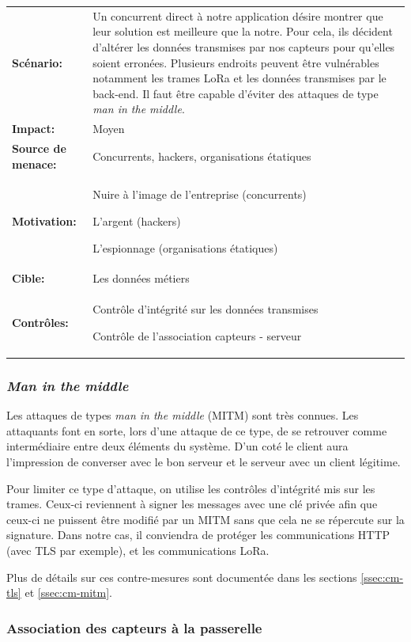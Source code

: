 \documentclass[12pt]{article}
\begin{document}
\renewcommand{\arraystretch}{1.6}
\begin{tabular}{@{}p{4cm}p{12cm}}
\textbf{Scénario:} &  Un concurrent direct à notre application désire montrer que leur solution est meilleure que la notre. Pour cela, ils décident d'altérer les données transmises par nos capteurs pour qu'elles soient erronées. Plusieurs endroits peuvent être vulnérables notamment les trames LoRa et les données transmises par le back-end. Il faut être capable d'éviter des attaques de type \emph{man in the middle}.  \\
\textbf{Impact:} & Moyen \\
\textbf{Source de menace: } & Concurrents, hackers, organisations étatiques \\
\textbf{Motivation:} & Nuire à l'image de l'entreprise (concurrents)

L'argent (hackers)

L'espionnage (organisations étatiques)\\
\textbf{Cible:} & Les données métiers\\
\textbf{Contrôles:} & Contrôle d'intégrité sur les données transmises

Contrôle de l'association capteurs - serveur
\end{tabular}
\renewcommand{\arraystretch}{1}

\subsubsection{\emph{Man in the middle}}

Les attaques de types \emph{man in the middle} (MITM) sont très connues. Les attaquants font en sorte, lors d'une attaque de ce type, de se retrouver comme intermédiaire entre deux éléments du système. D'un coté le client aura l'impression de converser avec le bon serveur et le serveur avec un client légitime. 

Pour limiter ce type d'attaque, on utilise les contrôles d'intégrité mis sur les trames. Ceux-ci reviennent à signer les messages avec une clé privée afin que ceux-ci ne puissent être modifié par un MITM sans que cela ne se répercute sur la signature. Dans notre cas, il conviendra de protéger les communications HTTP (avec TLS par exemple), et les communications LoRa. 

Plus de détails sur ces contre-mesures sont documentée dans les sections \ref{ssec:cm-tls} et \ref{ssec:cm-mitm}.

\subsubsection{Association des capteurs à la passerelle}
\end{document}
